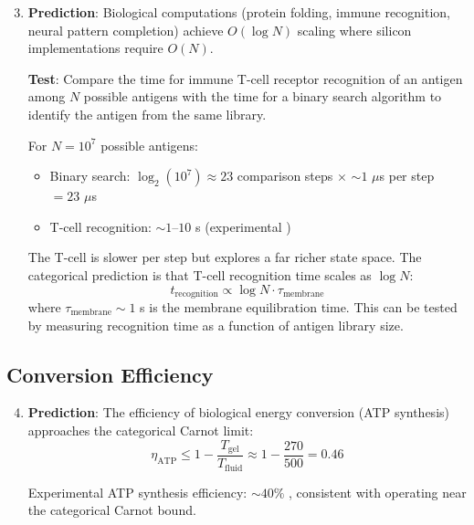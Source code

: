 \documentclass[twocolumn,10pt]{article}
\theoremstyle{remark}
\begin{document}
\begin{enumerate}
    \setcounter{enumi}{2}
    \item \textbf{Prediction}: Biological computations (protein folding, immune recognition, neural pattern completion) achieve $O(\log N)$ scaling where silicon implementations require $O(N)$.

    \textbf{Test}: Compare the time for immune T-cell receptor recognition of an antigen among $N$ possible antigens with the time for a binary search algorithm to identify the antigen from the same library.

    For $N = 10^7$ possible antigens:
    \begin{itemize}
        \item Binary search: $\log_2(10^7) \approx 23$ comparison steps $\times$ $\sim 1$ $\mu$s per step $= 23$ $\mu$s
        \item T-cell recognition: $\sim 1$--$10$ s (experimental \cite{huppa2010})
    \end{itemize}

    The T-cell is slower per step but explores a far richer state space. The categorical prediction is that T-cell recognition time scales as $\log N$:
    \begin{equation}
        t_{\text{recognition}} \propto \log N \cdot \tau_{\text{membrane}}
    \end{equation}
    where $\tau_{\text{membrane}} \sim 1$ s is the membrane equilibration time. This can be tested by measuring recognition time as a function of antigen library size.
\end{enumerate}

\subsection{Conversion Efficiency}

\begin{enumerate}
    \setcounter{enumi}{3}
    \item \textbf{Prediction}: The efficiency of biological energy conversion (ATP synthesis) approaches the categorical Carnot limit:
    \begin{equation}
        \eta_{\text{ATP}} \leq 1 - \frac{T_{\text{gel}}}{T_{\text{fluid}}} \approx 1 - \frac{270}{500} = 0.46
    \end{equation}

    Experimental ATP synthesis efficiency: $\sim 40\%$ \cite{nicholls2013}, consistent with operating near the categorical Carnot bound.
\end{enumerate}
\end{document}
